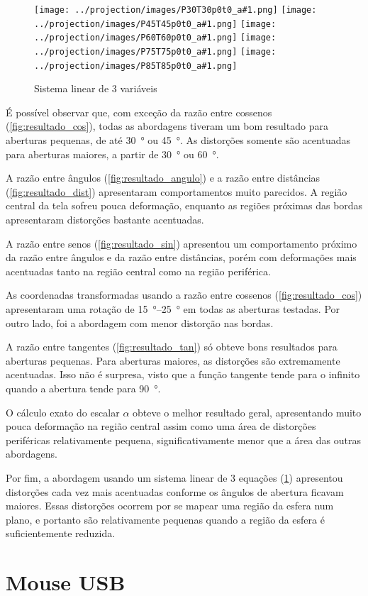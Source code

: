 \documentclass[brazil,pagestart=firstchapter]{abnt}
\newcommand*{\resultadoimagens}[1]{
	\texttt{[image: ../projection/images/P30T30p0t0\_a\#1.png]}
	\texttt{[image: ../projection/images/P45T45p0t0\_a\#1.png]}
	\texttt{[image: ../projection/images/P60T60p0t0\_a\#1.png]}
	\texttt{[image: ../projection/images/P75T75p0t0\_a\#1.png]}
	\texttt{[image: ../projection/images/P85T85p0t0\_a\#1.png]}
}
\begin{document}
\begin{figure}
\centering
\resultadoimagens{13}
\caption{Sistema linear de 3 variáveis}
\label{fig:resultado_lineq}
\end{figure}

É possível observar que, com exceção da razão entre cossenos
(\ref{fig:resultado_cos}), todas as abordagens tiveram um bom resultado para
aberturas pequenas, de até \SI{30}{\degree} ou \SI{45}{\degree}. As
distorções somente são acentuadas para aberturas maiores, a partir de
\SI{30}{\degree} ou \SI{60}{\degree}.

A razão entre ângulos (\ref{fig:resultado_angulo}) e a razão entre
distâncias (\ref{fig:resultado_dist}) apresentaram comportamentos muito
parecidos. A região central da tela sofreu pouca deformação, enquanto as
regiões próximas das bordas apresentaram distorções bastante acentuadas.

A razão entre senos (\ref{fig:resultado_sin}) apresentou um comportamento
próximo da razão entre ângulos e da razão entre distâncias, porém com
deformações mais acentuadas tanto na região central como na região
periférica.

As coordenadas transformadas usando a razão entre cossenos
(\ref{fig:resultado_cos}) apresentaram uma rotação de
\SIrange{15}{25}{\degree} em todas as aberturas testadas. Por outro lado,
foi a abordagem com menor distorção nas bordas.

A razão entre tangentes (\ref{fig:resultado_tan}) só obteve bons resultados
para aberturas pequenas. Para aberturas maiores, as distorções são
extremamente acentuadas. Isso não é surpresa, visto que a função tangente
tende para o infinito quando a abertura tende para \SI{90}{\degree}.

O cálculo exato do escalar $\alpha$ obteve o melhor resultado geral,
apresentando muito pouca deformação na região central assim como uma área de
distorções periféricas relativamente pequena, significativamente menor que a
área das outras abordagens.

Por fim, a abordagem usando um sistema linear de 3 equações
(\ref{fig:resultado_lineq}) apresentou distorções cada vez mais acentuadas
conforme os ângulos de abertura ficavam maiores. Essas distorções ocorrem
por se mapear uma região da esfera num plano, e portanto são relativamente
pequenas quando a região da esfera é suficientemente reduzida.


\section{Mouse USB} \label{sec:mouse}
\end{document}
